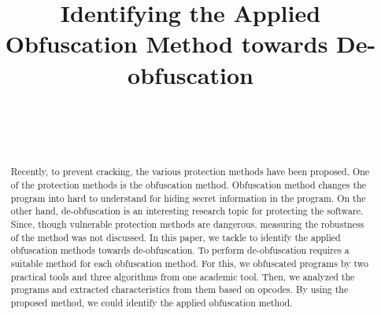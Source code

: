 \documentclass[conference]{IEEEtran}
\begin{document}
\title{Identifying the Applied Obfuscation Method towards De-obfuscation}

\author{
  \\
\and
{}
  \\
}

\maketitle

\begin{abstract}
  Recently, to prevent cracking, the various protection methods have
  been proposed.  One of the protection methods is the obfuscation
  method. Obfuscation method changes the program into hard to
  understand for hiding secret information in the program.
  On the other hand, de-obfuscation is an interesting research topic
  for protecting the software.  Since, though vulnerable protection
  methods are dangerous, measuring the robustness of the method was not
  discussed.
  In this paper, we tackle to identify the applied obfuscation methods
  towards de-obfuscation.  To perform de-obfuscation requires a
  suitable method for each obfuscation method.  For this, we
  obfuscated programs by two practical tools and three algorithms from
  one academic tool.  Then, we analyzed the programs and extracted
  characteristics from them based on opcodes.  By using the proposed
  method, we could identify the applied obfuscation method.
\end{abstract}
\end{document}
